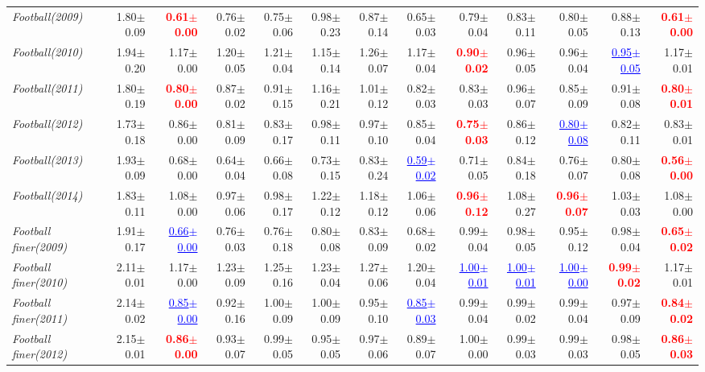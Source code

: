 \documentclass[nohyperref]{article}
\theoremstyle{plain}
\theoremstyle{definition}
\theoremstyle{remark}
\newcommand{\red}[1]{\textcolor{red}{\textbf{#1}}}
\newcommand{\blue}[1]{\textcolor{blue}{\underline{#1}}}
\begin{document}
\begin{table*}[!ht]
{\begin{tabular}{lrr|rrrrr|rrrrr}
			{\it Football(2009)} & 1.80$\pm$0.09 & \red{0.61$\pm$0.00} & 0.76$\pm$0.02 & 0.75$\pm$0.06 & 0.98$\pm$0.23 & 0.87$\pm$0.14 & 0.65$\pm$0.03 & 0.79$\pm$0.04 & 0.83$\pm$0.11 & 0.80$\pm$0.05 & 0.88$\pm$0.13 & \red{0.61$\pm$0.00} \\
			{\it Football(2010)} & 1.94$\pm$0.20 & 1.17$\pm$0.00 & 1.20$\pm$0.05 & 1.21$\pm$0.04 & 1.15$\pm$0.14 & 1.26$\pm$0.07 & 1.17$\pm$0.04 & \red{0.90$\pm$0.02} & 0.96$\pm$0.05 & 0.96$\pm$0.04 & \blue{0.95$\pm$0.05} & 1.17$\pm$0.01 \\
			{\it Football(2011)} & 1.80$\pm$0.19 & \red{0.80$\pm$0.00} & 0.87$\pm$0.02 & 0.91$\pm$0.15 & 1.16$\pm$0.21 & 1.01$\pm$0.12 & 0.82$\pm$0.03 & 0.83$\pm$0.03 & 0.96$\pm$0.07 & 0.85$\pm$0.09 & 0.91$\pm$0.08 & \red{0.80$\pm$0.01} \\
			{\it Football(2012)} & 1.73$\pm$0.18 & 0.86$\pm$0.00 & 0.81$\pm$0.09 & 0.83$\pm$0.17 & 0.98$\pm$0.11 & 0.97$\pm$0.10 & 0.85$\pm$0.04 & \red{0.75$\pm$0.03} & 0.86$\pm$0.12 & \blue{0.80$\pm$0.08} & 0.82$\pm$0.11 & 0.83$\pm$0.01 \\
			{\it Football(2013)} & 1.93$\pm$0.09 & 0.68$\pm$0.00 & 0.64$\pm$0.04 & 0.66$\pm$0.08 & 0.73$\pm$0.15 & 0.83$\pm$0.24 & \blue{0.59$\pm$0.02} & 0.71$\pm$0.05 & 0.84$\pm$0.18 & 0.76$\pm$0.07 & 0.80$\pm$0.08 & \red{0.56$\pm$0.00} \\
			{\it Football(2014)} & 1.83$\pm$0.11 & 1.08$\pm$0.00 & 0.97$\pm$0.06 & 0.98$\pm$0.17 & 1.22$\pm$0.12 & 1.18$\pm$0.12 & 1.06$\pm$0.06 & \red{0.96$\pm$0.12} & 1.08$\pm$0.27 & \red{0.96$\pm$0.07} & 1.03$\pm$0.03 & 1.08$\pm$0.00 \\
			{\it Football finer(2009)} & 1.91$\pm$0.17 & \blue{0.66$\pm$0.00} & 0.76$\pm$0.03 & 0.76$\pm$0.18 & 0.80$\pm$0.08 & 0.83$\pm$0.09 & 0.68$\pm$0.02 & 0.99$\pm$0.04 & 0.98$\pm$0.05 & 0.95$\pm$0.12 & 0.98$\pm$0.04 & \red{0.65$\pm$0.02} \\
			{\it Football finer(2010)} & 2.11$\pm$0.01 & 1.17$\pm$0.00 & 1.23$\pm$0.09 & 1.25$\pm$0.16 & 1.23$\pm$0.04 & 1.27$\pm$0.06 & 1.20$\pm$0.04 & \blue{1.00$\pm$0.01} & \blue{1.00$\pm$0.01} & \blue{1.00$\pm$0.00} & \red{0.99$\pm$0.02} & 1.17$\pm$0.01 \\
			{\it Football finer(2011)} & 2.14$\pm$0.02 & \blue{0.85$\pm$0.00} & 0.92$\pm$0.16 & 1.00$\pm$0.09 & 1.00$\pm$0.09 & 0.95$\pm$0.10 & \blue{0.85$\pm$0.03} & 0.99$\pm$0.04 & 0.99$\pm$0.02 & 0.99$\pm$0.04 & 0.97$\pm$0.09 & \red{0.84$\pm$0.02} \\
			{\it Football finer(2012)} & 2.15$\pm$0.01 & \red{0.86$\pm$0.00} & 0.93$\pm$0.07 & 0.99$\pm$0.05 & 0.95$\pm$0.05 & 0.97$\pm$0.06 & 0.89$\pm$0.07 & 1.00$\pm$0.00 & 0.99$\pm$0.03 & 0.99$\pm$0.03 & 0.98$\pm$0.05 & \red{0.86$\pm$0.03} \\

\end{tabular}}
\end{table*}
\end{document}
